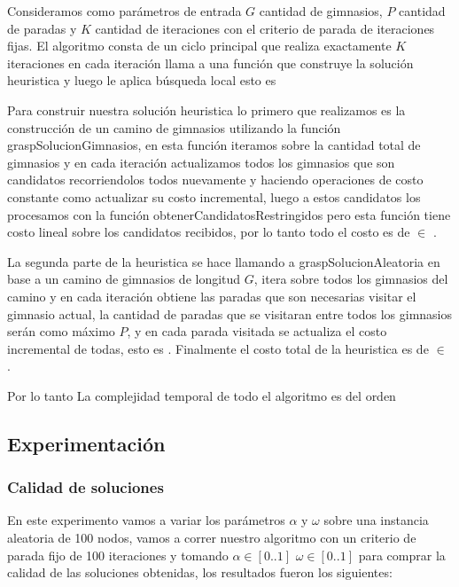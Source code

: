 Consideramos como parámetros de entrada $G$ cantidad de gimnasios, $P$ cantidad de paradas y $K$ cantidad de iteraciones con el criterio de parada de iteraciones fijas.
El algoritmo consta de un ciclo principal que realiza exactamente $K$ iteraciones en cada iteración llama a una función que construye la solución heuristica y luego le aplica búsqueda local esto es  

Para construir nuestra solución heuristica lo primero que realizamos es la construcción de un camino de gimnasios utilizando la función graspSolucionGimnasios, en esta función iteramos sobre la cantidad total de gimnasios y en cada iteración actualizamos todos los gimnasios que son candidatos recorriendolos todos nuevamente y haciendo operaciones de costo constante como actualizar su costo incremental, luego a estos candidatos los procesamos con la función obtenerCandidatosRestringidos pero esta función tiene costo lineal sobre los candidatos recibidos, por lo tanto todo el costo es de  $\in$ .

La segunda parte de la heuristica se hace llamando a graspSolucionAleatoria en base a un camino de gimnasios de longitud $G$, itera sobre todos los gimnasios del camino y en cada iteración obtiene las paradas que son necesarias visitar el gimnasio actual, la cantidad de paradas que se visitaran entre todos los gimnasios serán como máximo $P$, y en cada parada visitada se actualiza el costo incremental de todas, esto es . Finalmente el costo total de la heuristica es de  $\in$ .

Por lo tanto La complejidad temporal de todo el algoritmo es del orden 

\subsection{Experimentación}

\subsubsection{Calidad de soluciones}

En este experimento vamos a variar los parámetros $\alpha$ y  $\omega$ sobre una instancia aleatoria de 100 nodos, vamos a correr nuestro algoritmo con un criterio de parada fijo de 100 iteraciones y tomando $\alpha \in [0..1]$ $\omega \in [0..1]$ para comprar la calidad de las soluciones obtenidas, los resultados fueron los siguientes:

